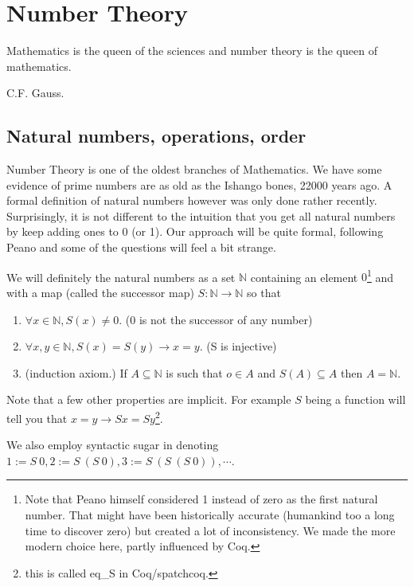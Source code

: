 \chapter{Number Theory}\label{ch:numbers}
\epigraph{Mathematics is the queen of the sciences and number theory is the queen of mathematics.}{ C.F. Gauss.}

\section{Natural numbers, operations, order}

Number Theory is one of the oldest branches of Mathematics. We have some evidence of  prime numbers are as old as the Ishango bones, 22000 years ago. A formal definition of natural numbers however was only done rather recently. Surprisingly, it is not different to the intuition that you get all natural numbers by keep adding ones to  0 (or 1). Our approach will be quite formal, following Peano  and some of the questions will feel a bit strange. 

We will definitely the natural numbers as a set $\mathbb{N}$ containing an element $0$\footnote{Note that Peano himself considered 1 instead of zero as the first natural number. That might have been historically accurate (humankind too a long time to discover zero) but created a lot of inconsistency. We made the more modern choice here, partly influenced by Coq.} and with a map (called the successor map) $S:\mathbb{N}\rightarrow \mathbb{N}$ so that 


\begin{enumerate}


\item $\forall x \in \mathbb{N}, S(x)\ne 0$. (0 is not the successor of any number)

\item $\forall x, y \in \mathbb{N}, S(x)=S(y)\rightarrow x=y$. (S is injective)

\item  (induction axiom.) If $A\subseteq \mathbb{N}$ is such that $o \in A$ and $S(A) \subseteq A$ then $A=\mathbb{N}$.
\end{enumerate}

Note that a few other properties are implicit. For example $S$ being a function will tell you that $x=y \rightarrow  S x = S y$\footnote{ this is called eq\_S in Coq/spatchcoq.}. 

We also employ syntactic sugar in denoting $1:=S\  0, 2:= S\  (S\  0), 3:= S\ ( S\  (S\ 0 )), \cdots$.



